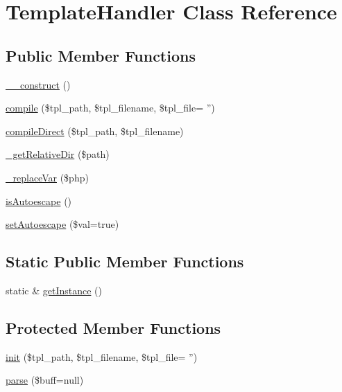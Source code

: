 \hypertarget{classTemplateHandler}{\section{Template\-Handler Class Reference}
\label{classTemplateHandler}
}
\subsection*{Public Member Functions}
\begin{DoxyCompactItemize}
\item 
\hyperlink{classTemplateHandler_ab113c65769e65c4fe531c4cf41655f1d}{\-\_\-\-\_\-construct} ()
\item 
\hyperlink{classTemplateHandler_ae2e69591d815bb49316bb85adbaff581}{compile} (\$tpl\-\_\-path, \$tpl\-\_\-filename, \$tpl\-\_\-file= '')
\item 
\hyperlink{classTemplateHandler_a1fe9c84873c23970ea7779be59dcb2d5}{compile\-Direct} (\$tpl\-\_\-path, \$tpl\-\_\-filename)
\item 
\hyperlink{classTemplateHandler_a6d8e3da7128be8bded89dc9edc4a1bc8}{\-\_\-get\-Relative\-Dir} (\$path)
\item 
\hyperlink{classTemplateHandler_a10cb255c35e1e617f182e349b80cc335}{\-\_\-replace\-Var} (\$php)
\item 
\hyperlink{classTemplateHandler_a5fc6e22637e893189c769c4824b624ff}{is\-Autoescape} ()
\item 
\hyperlink{classTemplateHandler_a27cb0b297f6cc2e2c6846515e35aa48b}{set\-Autoescape} (\$val=true)
\end{DoxyCompactItemize}
\subsection*{Static Public Member Functions}
\begin{DoxyCompactItemize}
\item 
static \& \hyperlink{classTemplateHandler_a9745460c5daccfc48abf8652778b2718}{get\-Instance} ()
\end{DoxyCompactItemize}
\subsection*{Protected Member Functions}
\begin{DoxyCompactItemize}
\item 
\hyperlink{classTemplateHandler_a783df180d319abe3722862ed6edacb9d}{init} (\$tpl\-\_\-path, \$tpl\-\_\-filename, \$tpl\-\_\-file= '')
\item 
\hyperlink{classTemplateHandler_acf0023ac6383d43e9b0ab854c75c0694}{parse} (\$buff=null)
\end{DoxyCompactItemize}


